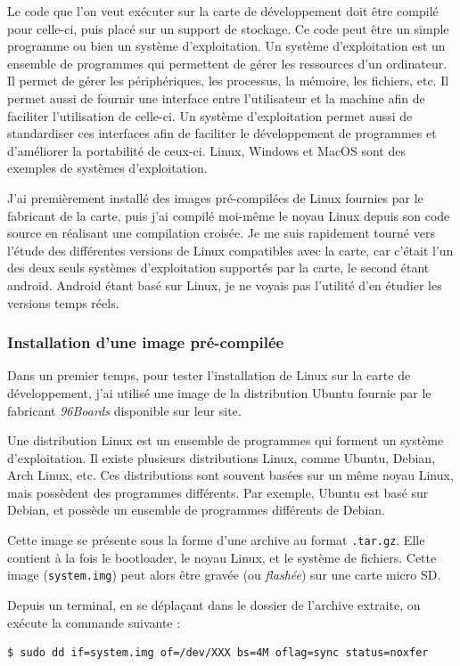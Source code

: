 Le code que l'on veut exécuter sur la carte de développement doit être compilé pour celle-ci, puis placé sur un support de stockage. Ce code peut être un simple programme ou bien un système d'exploitation. Un système d'exploitation est un ensemble de programmes qui permettent de gérer les ressources d'un ordinateur. Il permet de gérer les périphériques, les processus, la mémoire, les fichiers, etc. Il permet aussi de fournir une interface entre l'utilisateur et la machine afin de faciliter l'utilisation de celle-ci. Un système d'exploitation permet aussi de standardiser ces interfaces afin de faciliter le développement de programmes et d'améliorer la portabilité de ceux-ci. Linux, Windows et MacOS sont des exemples de systèmes d'exploitation.

J'ai premièrement installé des images pré-compilées de Linux fournies par le fabricant de la carte, puis j'ai compilé moi-même le noyau Linux depuis son code source en réalisant une compilation croisée. Je me suis rapidement tourné vers l'étude des différentes versions de Linux compatibles avec la carte, car c'était l'un des deux seuls systèmes d'exploitation supportés par la carte, le second étant android. Android étant basé sur Linux, je ne voyais pas l'utilité d'en étudier les versions temps réels. 

\subsubsection{Installation d'une image pré-compilée}

Dans un premier temps, pour tester l'installation de Linux sur la carte de développement, j'ai utilisé une image de la distribution Ubuntu fournie par le fabricant \textit{96Boards} disponible sur leur site. 

Une distribution Linux est un ensemble de programmes qui forment un système d'exploitation. Il existe plusieurs distributions Linux, comme Ubuntu, Debian, Arch Linux, etc. Ces distributions sont souvent basées sur un même noyau Linux, mais possèdent des programmes différents. Par exemple, Ubuntu est basé sur Debian, et possède un ensemble de programmes différents de Debian.

Cette image se présente sous la forme d'une archive au format \texttt{.tar.gz}. Elle contient à la fois le \gls{bootloader}, le noyau Linux, et le système de fichiers. Cette image (\texttt{system.img}) peut alors être gravée (ou \textit{flashée}) sur une carte micro SD. 

Depuis un terminal, en se déplaçant dans le dossier de l'archive extraite, on exécute la commande suivante : 
\begin{lstlisting}[style=command, caption=Téléversement de l'image sur la carte microSD]
$ sudo dd if=system.img of=/dev/XXX bs=4M oflag=sync status=noxfer
\end{lstlisting}

